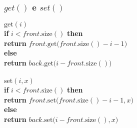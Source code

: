 \documentclass{beamer}
\begin{document}
\begin{frame}
\frametitle{$get()$ e $set()$}
\begin{oframed}
\begin{flushleft}
\hspace*{1em} $\ensuremath{\mathrm{get}(\ensuremath{\mathit{i}})}$\\
\hspace*{1em} \hspace*{1em} {\color{black} \textbf{if}} $\ensuremath{\ensuremath{\mathit{i}} < \ensuremath{\mathit{front}}.\mathrm{size}()}$ {\color{black} \textbf{then}} \\
\hspace*{1em} \hspace*{1em} \hspace*{1em} {\color{black} \textbf{return}} $\ensuremath{\ensuremath{\mathit{front}}.\mathrm{get}(\ensuremath{\mathit{front}}.\mathrm{size}()-\ensuremath{\mathit{i}}-1})$\\
\hspace*{1em} \hspace*{1em} {\color{black} \textbf{else}} \\
\hspace*{1em} \hspace*{1em} \hspace*{1em} {\color{black} \textbf{return}} $\ensuremath{\ensuremath{\mathit{back}}.\mathrm{get}(\ensuremath{\mathit{i}}-\ensuremath{\mathit{front}}.\mathrm{size}()})$\\
\ \\
\hspace*{1em} $\ensuremath{\mathrm{set}(\ensuremath{\mathit{i}}, \ensuremath{\mathit{x}})}$\\
\hspace*{1em} \hspace*{1em} {\color{black} \textbf{if}} $\ensuremath{\ensuremath{\mathit{i}} < \ensuremath{\mathit{front}}.\mathrm{size}()}$ {\color{black} \textbf{then}} \\
\hspace*{1em} \hspace*{1em} \hspace*{1em} {\color{black} \textbf{return}} $\ensuremath{\ensuremath{\mathit{front}}.\mathrm{set}(\ensuremath{\mathit{front}}.\mathrm{size}()-\ensuremath{\mathit{i}}-1, x})$\\
\hspace*{1em} \hspace*{1em} {\color{black} \textbf{else}} \\
\hspace*{1em} \hspace*{1em} \hspace*{1em} {\color{black} \textbf{return}} $\ensuremath{\ensuremath{\mathit{back}}.\mathrm{set}(\ensuremath{\mathit{i}}-\ensuremath{\mathit{front}}.\mathrm{size}(), x})$\\
\end{flushleft}
\end{oframed}
\end{frame}
\end{document}
